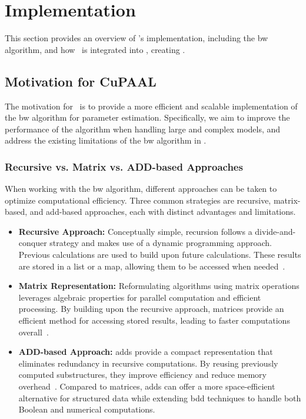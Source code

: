 \section{Implementation}\label{sec:implementation}
This section provides an overview of \Cupaal's implementation, including the \gls{bw} algorithm, and how \Cupaal\ is integrated into \Jajapy, creating \JajapyTwo.

\subsection{Motivation for CuPAAL}\label{subsec:motivation-for-cupaal}
The motivation for \Cupaal\ is to provide a more efficient and scalable implementation of the \gls{bw} algorithm for parameter estimation.
Specifically, we aim to improve the performance of the algorithm when handling large and complex models, and address the existing limitations of the \gls{bw} algorithm in \Jajapy.

\subsubsection{Recursive vs. Matrix vs. ADD-based Approaches}\label{subsec:approaches}
When working with the \gls{bw} algorithm, different approaches can be taken to optimize computational efficiency.
Three common strategies are recursive, matrix-based, and \gls{add}-based approaches, each with distinct advantages and limitations.


\begin{itemize}
    \item \textbf{Recursive Approach:} Conceptually simple, recursion follows a divide-and-conquer strategy and makes use of a dynamic programming approach. Previous calculations are used to build upon future calculations. These results are stored in a list or a map, allowing them to be accessed when needed~\cite[Chapter 4]{cormen2022introduction}.
    \item \textbf{Matrix Representation:} Reformulating algorithms using matrix operations leverages algebraic properties for parallel computation and efficient processing.
          By building upon the recursive approach, matrices provide an efficient method for accessing stored results, leading to faster computations overall~\cite[Chapter 4, 15 \& 28]{cormen2022introduction}.
    \item \textbf{ADD-based Approach:} \glspl{add} provide a compact representation that eliminates redundancy in recursive computations.
          By reusing previously computed substructures, they improve efficiency and reduce memory overhead~\cite{bahar1997algebric}.
          Compared to matrices, \glspl{add} can offer a more space-efficient alternative for structured data while extending \gls{bdd} techniques to handle both Boolean and numerical computations.
\end{itemize}


